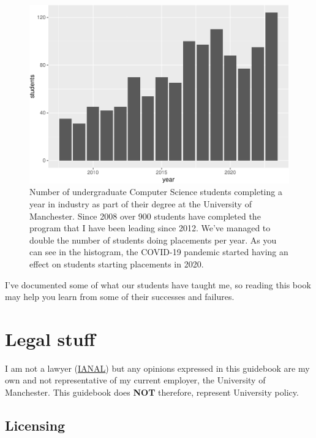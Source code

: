 \documentclass[
]{book}
\begin{document}
\begin{figure}

{\centering \includegraphics[width=1\linewidth]{cdyf_files/figure-latex/ie-fig-1} 

}

\caption{Number of undergraduate Computer Science students completing a year in industry as part of their degree at the University of Manchester. Since 2008 over 900 students have completed the program that I have been leading since 2012. We've managed to double the number of students doing placements per year. As you can see in the histogram, the COVID-19 pandemic started having an effect on students starting placements in 2020.}\label{fig:ie-fig}
\end{figure}



I've documented some of what our students have taught me, so reading this book may help you learn from some of their successes and failures.

\hypertarget{legal}{%
\section{Legal stuff}\label{legal}}

I am not a lawyer (\href{https://en.wikipedia.org/wiki/IANAL}{IANAL}) but any opinions expressed in this guidebook are my own and not representative of my current employer, the University of Manchester. This guidebook does \textbf{NOT} therefore, represent University policy.

\hypertarget{license}{%
\subsection{Licensing}\label{license}}
\end{document}
